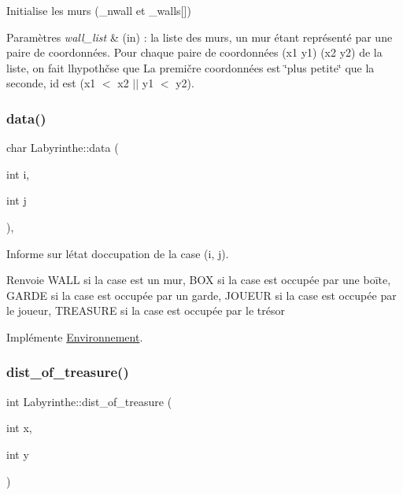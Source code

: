Initialise les murs (\+\_\+nwall et \+\_\+walls\mbox{[}\mbox{]}) 


\begin{DoxyParams}{Paramètres}
{\em wall\+\_\+list} & (in) \+: la liste des murs, un mur étant représenté par une paire de coordonnées. Pour chaque paire de coordonnées (x1 y1) (x2 y2) de la liste, on fait l\textquotesingle{}hypothčse que La premičre coordonnées est \char`\"{}plus petite\char`\"{} que la seconde, id est (x1 $<$ x2 $\vert$$\vert$ y1 $<$ y2). \\
\hline
\end{DoxyParams}
\mbox{\label{classLabyrinthe_a433936ae60ddf3f0b85a407f414b8d38}} 
\subsubsection{\texorpdfstring{data()}{data()}}
{\footnotesize\ttfamily char Labyrinthe\+::data (\begin{DoxyParamCaption}\item[{int}]{i,  }\item[{int}]{j }\end{DoxyParamCaption})\hspace{0.3cm}{\ttfamily [inline]}, {\ttfamily [virtual]}}



Informe sur l\textquotesingle{}état d\textquotesingle{}occupation de la case (i, j). 

\begin{DoxyReturn}{Renvoie}
W\+A\+LL si la case est un mur, B\+OX si la case est occupée par une boīte, G\+A\+R\+DE si la case est occupée par un garde, J\+O\+U\+E\+UR si la case est occupée par le joueur, T\+R\+E\+A\+S\+U\+RE si la case est occupée par le trésor 
\end{DoxyReturn}


Implémente \hyperlink{classEnvironnement_a0fae4716da729dbf13f52f09f2d293cd}{Environnement}.

\mbox{\label{classLabyrinthe_afed17fdb2dce31cb4671da03c05b88d7}} 
\subsubsection{\texorpdfstring{dist\+\_\+of\+\_\+treasure()}{dist\_of\_treasure()}}
{\footnotesize\ttfamily int Labyrinthe\+::dist\+\_\+of\+\_\+treasure (\begin{DoxyParamCaption}\item[{int}]{x,  }\item[{int}]{y }\end{DoxyParamCaption})\hspace{0.3cm}{\ttfamily [inline]}}



